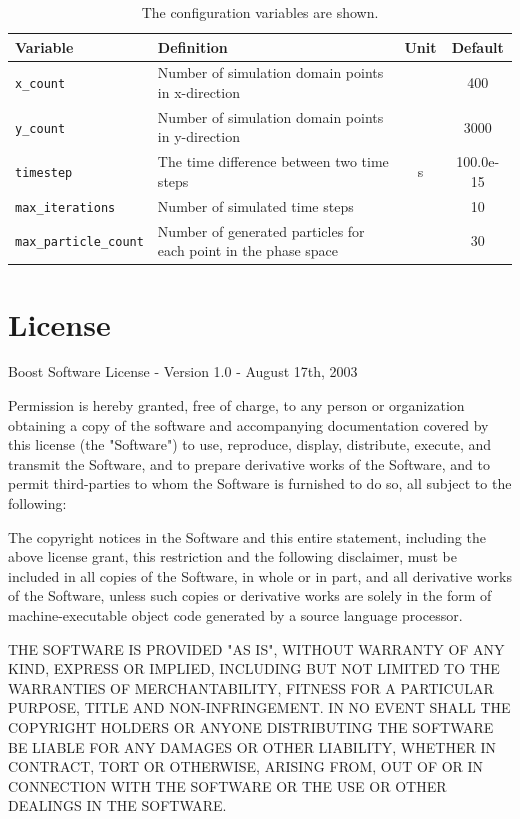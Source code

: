 \begin{table}[ht!]
\centering
\begin{tabular}{|l|p{5cm}|c|c|}
\hline
\textbf{Variable}   & \textbf{Definition}   & \textbf{Unit} &\textbf{Default} \\
\hline
\texttt{x\_count}  & Number of simulation domain points in x-direction &  & 400 \\
\hline
\texttt{y\_count}  & Number of simulation domain points in y-direction &  & 3000 \\
\hline
\texttt{timestep}  & The time difference between two time steps &  s & 100.0e-15 \\
\hline
\texttt{max\_iterations}  & Number of simulated time steps &  & 10 \\
\hline
\texttt{max\_particle\_count}  &  Number of generated particles for each point in the phase space   &  & 30 \\
\hline
\end{tabular}
\caption{The configuration variables are shown.}
\label{tab:configs}
\end{table}

\clearpage

\section{License}

Boost Software License - Version 1.0 - August 17th, 2003

Permission is hereby granted, free of charge, to any person or organization
obtaining a copy of the software and accompanying documentation covered by
this license (the "Software") to use, reproduce, display, distribute,
execute, and transmit the Software, and to prepare derivative works of the
Software, and to permit third-parties to whom the Software is furnished to
do so, all subject to the following:

The copyright notices in the Software and this entire statement, including
the above license grant, this restriction and the following disclaimer,
must be included in all copies of the Software, in whole or in part, and
all derivative works of the Software, unless such copies or derivative
works are solely in the form of machine-executable object code generated by
a source language processor.

THE SOFTWARE IS PROVIDED "AS IS", WITHOUT WARRANTY OF ANY KIND, EXPRESS OR
IMPLIED, INCLUDING BUT NOT LIMITED TO THE WARRANTIES OF MERCHANTABILITY,
FITNESS FOR A PARTICULAR PURPOSE, TITLE AND NON-INFRINGEMENT. IN NO EVENT
SHALL THE COPYRIGHT HOLDERS OR ANYONE DISTRIBUTING THE SOFTWARE BE LIABLE
FOR ANY DAMAGES OR OTHER LIABILITY, WHETHER IN CONTRACT, TORT OR OTHERWISE,
ARISING FROM, OUT OF OR IN CONNECTION WITH THE SOFTWARE OR THE USE OR OTHER
DEALINGS IN THE SOFTWARE.
